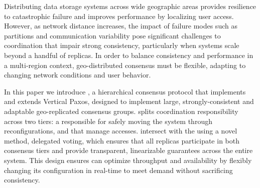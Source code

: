 Distributing data storage systems across wide geographic areas provides resilience to
catastrophic failure and improves performance by localizing user access.
However, as network distance increases, the impact of failure modes such as partitions
and communication variability pose significant challenges to coordination that impair
strong consistency, particularly when systems scale beyond a handful of replicas.
In order to balance consistency and performance in a multi-region context, geo-distributed
consensus must be flexible, adapting to changing network conditions and user behavior.

In this paper we introduce \sys, a hierarchical consensus protocol that implements and
extends Vertical Paxos, designed to implement large, strongly-consistent and adaptable
geo-replicated consensus groups.
\sys splits coordination responsibility across two tiers: a \roo responsible for
safely moving the system through reconfigurations, and \subs that manage accesses.
\Subs intersect with the \roo using a novel method, delegated voting, which ensures that
all replicas participate in both consensus tiers and provide transparent, linearizable
guarantees across the entire system.
This design ensures \sys can optimize throughput and availability by flexibly changing
its configuration in real-time to meet demand without sacrificing consistency.

